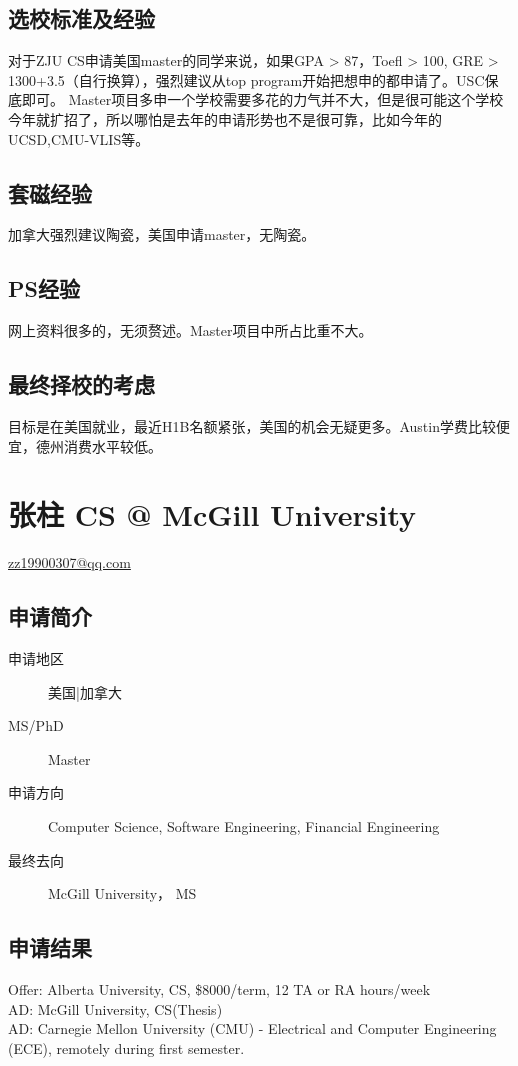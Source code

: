 \documentclass[11pt,fleqn,openany]{book} %
\begin{document}
\subsection*{选校标准及经验}
对于ZJU CS申请美国master的同学来说，如果GPA > 87，Toefl > 100, GRE > 1300+3.5（自行换算），强烈建议从top program开始把想申的都申请了。USC保底即可。
Master项目多申一个学校需要多花的力气并不大，但是很可能这个学校今年就扩招了，所以哪怕是去年的申请形势也不是很可靠，比如今年的UCSD,CMU-VLIS等。
\subsection*{套磁经验}
加拿大强烈建议陶瓷，美国申请master，无陶瓷。
\subsection*{PS经验}
网上资料很多的，无须赘述。Master项目中所占比重不大。
\subsection*{最终择校的考虑}
目标是在美国就业，最近H1B名额紧张，美国的机会无疑更多。Austin学费比较便宜，德州消费水平较低。
\clearpage
\section{张柱 CS @ McGill University}
\hfill \href{mailto:zz19900307@qq.com}{zz19900307@qq.com}

\noindent\begin{minipage}[t]{0.45\textwidth}
\subsection*{申请简介}
\begin{description}
\item[申请地区] 美国|加拿大
\item[MS/PhD] Master
\item[申请方向] Computer Science, Software Engineering, Financial Engineering
\item[最终去向] McGill University， MS
\end{description}
\end{minipage}
\hfill
\begin{minipage}[t]{0.45\textwidth}
\subsection*{申请结果}
\noindent Offer: Alberta University, CS, \$8000/term, 12 TA or RA hours/week\\
AD: McGill University, CS(Thesis)\\
AD: Carnegie Mellon University (CMU) - Electrical and Computer Engineering (ECE), remotely during first semester.
\end{minipage}
\end{document}
